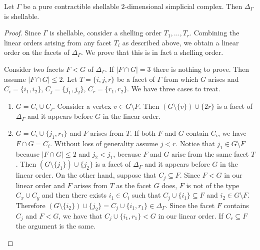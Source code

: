 \documentclass[10pt,a4paper]{amsart}
\renewcommand{\leq}{\leqslant}
\begin{document}
\begin{thm}\label{shell}
    Let $\Gamma$ be a pure contractible shellable $2$-dimensional simplicial complex. Then $\Delta_{\Gamma}$ is shellable.
\end{thm}

\begin{proof}
    Since $\Gamma$ is shellable, consider a shelling order $T_1,\ldots,T_r$. Combining the linear orders arising from any facet $T_i$ as described above, we obtain a linear order on the facets of $\Delta_\Gamma$. We prove that this is in fact a shelling order. 
    
    Consider two facets $F<G$ of $\Delta_{\Gamma}$. If $|F \cap G|=3$ there is nothing to prove. Then assume $|F \cap G| \leq 2$. 
    Let $T=\{i,j,r\}$ be a facet of $\Gamma$ from which $G$ arises and $C_i=\{i_1,i_2\}$, $C_j=\{j_1,j_2\}$, $C_r=\{r_1,r_2\}$. 
    We have three cases to treat.
\begin{enumerate}
    \item $G=C_i \cup C_j$. Consider a vertex $v \in G \setminus F$. Then $(G \setminus \{v\}) \cup \{2r\}$ is a facet of $\Delta_{\Gamma}$ and it appears before $G$ in the linear order.
    \item $G=C_i \cup \{j_1,r_1\}$ and $F$ arises from $T$. If both $F$ and $G$ contain $C_i$, we have $F \cap G=C_i$. Without loss of generality assume $j<r$. Notice that $j_1 \in G \setminus F$ because $|F\cap G|\leq 2$ and $j_2<j_1$, because $F$ and $G$ arise from the same facet $T$. Then $(G \setminus \{j_1\}) \cup \{j_2\}$ is a facet of $\Delta_{\Gamma}$ and it appears before $G$ in the linear order. On the other hand, suppose that $C_j \subseteq F$. Since $F<G$ in our linear order and $F$ arises from $T$ as the facet $G$ does, $F$ is not of the type $C_x\cup C_y$ and then there exists $i_1 \in C_i$ such that $C_j \cup \{i_1\} \subseteq F$ and $i_2 \in G \setminus F$. Therefore $(G \setminus \{i_2\}) \cup \{j_2\}=C_j \cup \{i_1,r_1\}\in \Delta_{\Gamma}$. Since the facet $F$ contains $C_j$ and $F<G$, we have that $C_j \cup \{i_1,r_1\} <G$ in our linear order. If $C_r \subseteq F$ the argument is the same.
    

\end{enumerate}
\end{proof}
\end{document}
